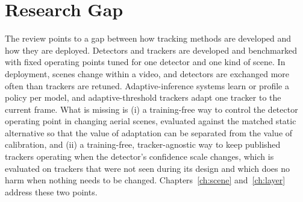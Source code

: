 \section{Research Gap}\label{sec:bg-gap}
The review points to a gap between how tracking methods are developed and how they are deployed. Detectors and trackers are developed and benchmarked with fixed operating points tuned for one detector and one kind of scene. In deployment, scenes change within a video, and detectors are exchanged more often than trackers are retuned. Adaptive-inference systems learn or profile a policy per model, and adaptive-threshold trackers adapt one tracker to the current frame. What is missing is (i) a training-free way to control the detector operating point in changing aerial scenes, evaluated against the matched static alternative so that the value of adaptation can be separated from the value of calibration, and (ii) a training-free, tracker-agnostic way to keep published trackers operating when the detector's confidence scale changes, which is evaluated on trackers that were not seen during its design and which does no harm when nothing needs to be changed. Chapters~\ref{ch:scene} and~\ref{ch:layer} address these two points.
